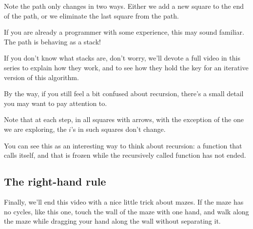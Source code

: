 \documentclass[12pt]{article}
\begin{document}
Note the path only changes in two ways.
Either we add a new square to the end of the path,
or we eliminate the last square from the path.

If you are already a programmer with some experience,
this may sound familiar. The path is behaving as a stack!

If you don't know what stacks are, don't worry,
we'll devote a full video in this series to explain how they work,
and to see how they hold the key for an iterative version
of this algorithm.

By the way, if you still feel a bit confused about recursion,
there's a small detail you may want to pay attention to.

Note that at each step, in all squares with arrows,
with the exception of the one we are exploring,
the $i$'s in such squares don't change.

You can see this as an interesting way to think about recursion:
a function that calls itself, and that is frozen
while the recursively called function has not ended.




\subsection{The right-hand rule}

Finally, we'll end this video with a nice little trick about
mazes. If the maze has no cycles, like this one,
touch the wall of the maze with one hand,
and walk along the maze while dragging your hand along
the wall without separating it.
\end{document}
